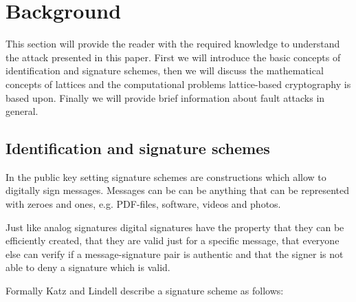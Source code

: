 %
\chapter{Background}
This section will provide the reader with the required knowledge to understand the attack presented in this paper. First we will introduce the basic concepts of identification and signature schemes, then we will discuss the mathematical concepts of lattices and the computational problems lattice-based cryptography is based upon. Finally we will provide brief information about fault attacks in general.

\section{Identification and signature schemes}
In the public key setting signature schemes are constructions which allow to digitally sign messages. Messages can be can be anything that can be represented with zeroes and ones, e.g. PDF-files, software, videos and photos.

Just like analog signatures digital signatures have the property that they can be efficiently created, that they are valid just for a specific message, that everyone else can verify if a message-signature pair is authentic and that the signer is not able to deny a signature which is valid.

Formally Katz and Lindell \cite[p.~442]{katzlindell} describe a signature scheme as follows:

